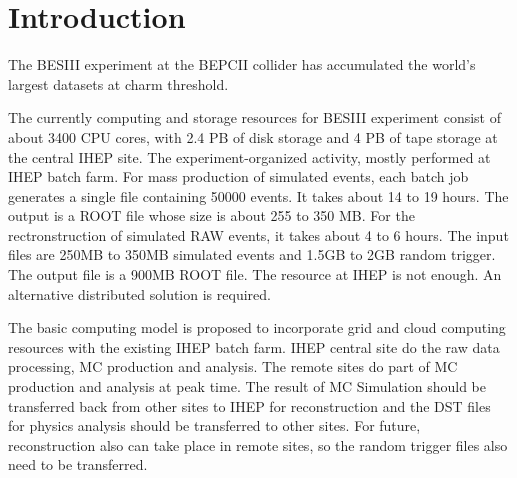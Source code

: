 \section{Introduction}
The BESIII experiment at the BEPCII collider has accumulated
the world's largest datasets at charm threshold.

The currently computing and storage resources for BESIII 
experiment consist of about 3400 CPU cores, with 2.4 PB of disk
storage and 4 PB of tape storage at the central IHEP site.
The experiment-organized activity, mostly performed at IHEP
batch farm. For mass production of simulated events,
each batch job generates a single file containing
50000 events. It takes about 14 to 19 hours. The output
is a ROOT file whose size is about 255 to 350 MB.
For the rectronstruction of simulated RAW events,
it takes about 4 to 6 hours. The input files are
250MB to 350MB simulated events and 1.5GB to 2GB random trigger.
The output file is a 900MB ROOT file.
The resource at IHEP is not enough.
An alternative distributed solution is required.

The basic computing model is proposed to incorporate grid and
cloud computing resources with the existing IHEP batch farm.
IHEP central site do the raw data processing, MC production
and analysis. The remote sites do part of MC production
and analysis at peak time.
The result of MC Simulation should be transferred back
from other sites to IHEP for reconstruction
and the DST files for physics analysis should be transferred
to other sites. For future, reconstruction also can take place 
in remote sites, so the random trigger files also need to be 
transferred.
